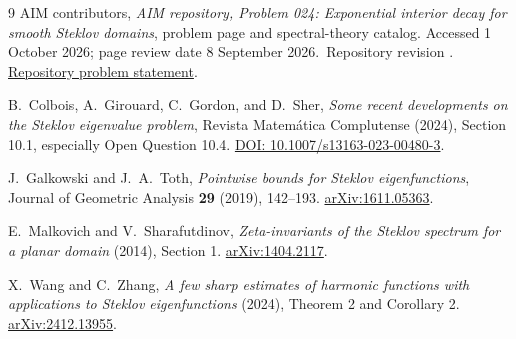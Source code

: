 \documentclass[11pt]{article}
\theoremstyle{remark}
\begin{document}
\begin{thebibliography}{9}
AIM contributors, \emph{AIM repository, Problem 024: Exponential interior decay for smooth Steklov domains}, problem page and spectral-theory catalog. Accessed 1 October 2026; page review date 8 September 2026.\
Repository revision .
\href{https://github.com/MColbrook/AIM/blob/aa776a01d7d48a79f93251af11fde9454b0aea95/problems/024-steklov-smooth-interior-decay.md}{Repository problem statement}.

B.~Colbois, A.~Girouard, C.~Gordon, and D.~Sher,
\emph{Some recent developments on the Steklov eigenvalue problem}, Revista Matem\'atica Complutense (2024), Section 10.1, especially Open Question 10.4.
\href{https://doi.org/10.1007/s13163-023-00480-3}{DOI: 10.1007/s13163-023-00480-3}.

J.~Galkowski and J.~A.~Toth,
\emph{Pointwise bounds for Steklov eigenfunctions}, Journal of Geometric Analysis \textbf{29} (2019), 142--193.
\href{https://arxiv.org/abs/1611.05363}{arXiv:1611.05363}.

E.~Malkovich and V.~Sharafutdinov,
\emph{Zeta-invariants of the Steklov spectrum for a planar domain} (2014), Section 1.
\href{https://arxiv.org/abs/1404.2117}{arXiv:1404.2117}.

X.~Wang and C.~Zhang,
\emph{A few sharp estimates of harmonic functions with applications to Steklov eigenfunctions} (2024), Theorem 2 and Corollary 2.
\href{https://arxiv.org/abs/2412.13955}{arXiv:2412.13955}.
\end{thebibliography}
\end{document}
